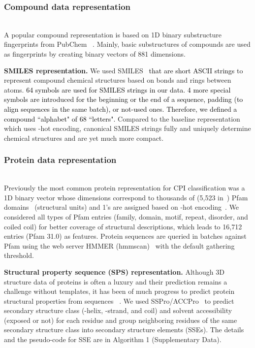 \documentclass[nocrop]{bioinfo}
\newcommand{\red}[1]{\textcolor{black}{#1}}
\begin{document}
\vspace{-1em}
\subsubsection{Compound data representation}
\vspace{-1em}
\hfill\\ A popular compound representation is based on 1D binary substructure fingerprints from PubChem ~\citep{wang2009pubchem}. Mainly, basic substructures of compounds are used as fingerprints by creating binary vectors of 881 dimensions. 

{\bf SMILES representation.} We used SMILES~\citep{weininger1988smiles} \red{that are short ASCII strings} to represent compound chemical structures based on bonds and rings between atoms. \red{64 symbols are used for SMILES strings in our data.  4 more special symbols are introduced for the beginning or the end of a sequence, padding  (to align sequences in the same batch), or not-used ones. Therefore, we defined a compound ``alphabet" of 68 ``letters".} 
Compared to the baseline representation which uses -hot encoding, canonical SMILES strings fully and uniquely determine chemical structures and are yet much more compact.   

\vspace{-1em}
\subsubsection{Protein data representation}
\vspace{-1em}

\hfill\\ Previously the most common protein representation for CPI classification was a 1D binary vector whose dimensions correspond to thousands of  (5,523 in~\citep{tian2016boosting}) Pfam domains~\citep{Pfam2014}  (structural units) and 1's are assigned based on -hot encoding~\citep{tabei2013scalable,cheng2016effectively}.  We considered all  types of Pfam entries  (family, domain, motif, repeat, disorder, and coiled coil) for better coverage of structural descriptions, which leads to 16,712 entries  (Pfam 31.0) as features.  
Protein sequences are queried in batches against Pfam using the web server HMMER  (hmmscan)~\citep{finn2015hmmer} with the default gathering threshold.   

{\bf Structural property sequence  (SPS) representation.}  Although 3D structure data of proteins is often a luxury and their prediction remains a challenge without templates, it has been of much progress to predict protein structural properties from  sequences
~\citep{cheng2005scratch,magnan2014sspro,RaptorX-Property}.
We used SSPro/ACCPro~\citep{magnan2014sspro} to predict secondary structure class  (-helix, -strand, and coil) and solvent accessibility  (exposed or not) for each residue and group neighboring residues of the same secondary structure class into secondary structure elements  (SSEs).  
The details and the pseudo-code for SSE are in Algorithm 1 (Supplementary Data).
\end{document}
